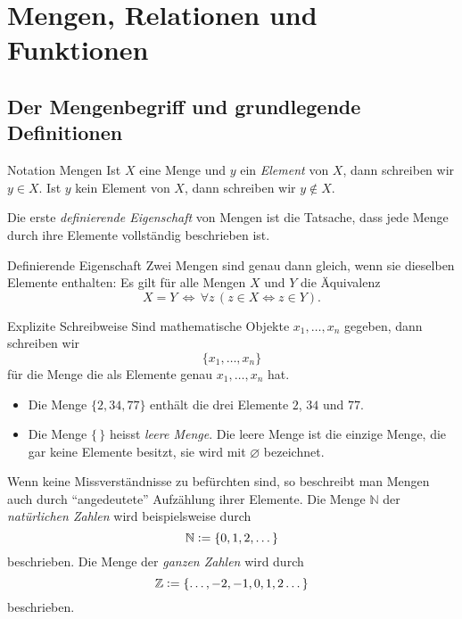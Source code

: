 \section{Mengen, Relationen und Funktionen}

\subsection{Der Mengenbegriff und grundlegende Definitionen}

\begin{concept}{Notation Mengen}
    Ist $X$ eine Menge und $y$ ein \textit{Element} von $X$, dann schreiben wir $y\in X$. Ist $y$ kein Element von $X$, dann schreiben wir $y\notin X$.
\end{concept}

\begin{remark}
    Die erste \textit{definierende Eigenschaft} von Mengen ist die Tatsache, dass jede Menge durch ihre Elemente vollständig beschrieben ist.
\end{remark}

\begin{definition}{Definierende Eigenschaft}
    Zwei Mengen sind genau dann gleich, wenn sie dieselben Elemente enthalten: Es gilt für alle Mengen $X$ und $Y$ die Äquivalenz
    \[
        X=Y\,\Leftrightarrow\,\forall z\, (z\in X\Leftrightarrow z\in Y).
    \]
\end{definition}

\begin{concept}{Explizite Schreibweise}
    Sind mathematische Objekte $x_1,\dots,x_n$ gegeben, dann schreiben wir
    \[
        \{x_1,\dots,x_n\}
    \]
    für die Menge die als Elemente genau $x_1,\dots,x_n$ hat.
\end{concept}

\begin{example}
    \begin{itemize}
        \item Die Menge $\{2,34,77\}$ enthält die drei Elemente $2$, $34$ und $77$.
        \item Die Menge $\{\,\}$ heisst \textit{leere Menge}. Die leere Menge ist die einzige Menge, die gar keine Elemente besitzt, sie wird mit $\varnothing $ bezeichnet.
    \end{itemize}
\end{example}

\begin{remark}
    Wenn keine Missverständnisse zu befürchten sind, so beschreibt man Mengen auch durch ``angedeutete'' Aufzählung ihrer Elemente. Die Menge $\mathbb{N}$ der \textit{natürlichen Zahlen} wird beispielsweise durch
    \[
        \mathbb{N}:=\{0,1,2,\dots\}
    \]
    beschrieben.
    Die Menge der \textit{ganzen Zahlen} wird durch
    \[
        \mathbb{Z}:=\{\dots, -2,-1,0,1,2\dots\}
    \]
    beschrieben.
\end{remark}

